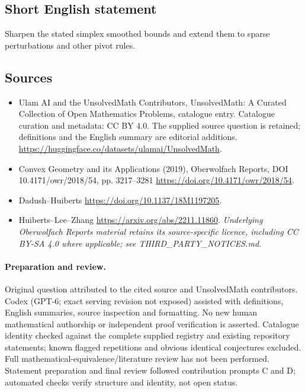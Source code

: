 \documentclass[11pt]{article}
\begin{document}
\subsection{Short English statement}
Sharpen the stated simplex smoothed bounds and extend them to sparse perturbations and other pivot rules.
\subsection{Sources}
\begin{itemize}
\item[\hypertarget{source:statement:1}{S1}] Ulam AI and the UnsolvedMath Contributors, UnsolvedMath: A Curated Collection of Open Mathematics Problems, catalogue entry. Catalogue curation and metadata: CC BY 4.0. The supplied source question is retained; definitions and the English summary are editorial additions.
\url{https://huggingface.co/datasets/ulamai/UnsolvedMath}.
\item[\hypertarget{source:statement:2}{S2}] Convex Geometry and its Applications (2019), Oberwolfach Reports, DOI 10.4171/owr/2018/54, pp. 3217--3281
\url{https://doi.org/10.4171/owr/2018/54}.
\item[\hypertarget{source:statement:3}{S3}] Dadush--Huiberts
\url{https://doi.org/10.1137/18M1197205}.
\item[\hypertarget{source:statement:4}{S4}] Huiberts--Lee--Zhang
\url{https://arxiv.org/abs/2211.11860}.
\textit{Underlying Oberwolfach Reports material retains its source-specific licence, including CC BY-SA 4.0 where applicable; see THIRD\_PARTY\_NOTICES.md.}
\end{itemize}
\paragraph{Preparation and review.}
Original question attributed to the cited source and UnsolvedMath contributors. Codex (GPT-6; exact serving revision not exposed) assisted with definitions, English summaries, source inspection and formatting. No new human mathematical authorship or independent proof verification is asserted. Catalogue identity checked against the complete supplied registry and existing repository statements; known flagged repetitions and obvious identical conjectures excluded. Full mathematical-equivalence/literature review has not been performed. Statement preparation and final review followed contribution prompts C and D; automated checks verify structure and identity, not open status.
\label{end:statement}
\end{document}
